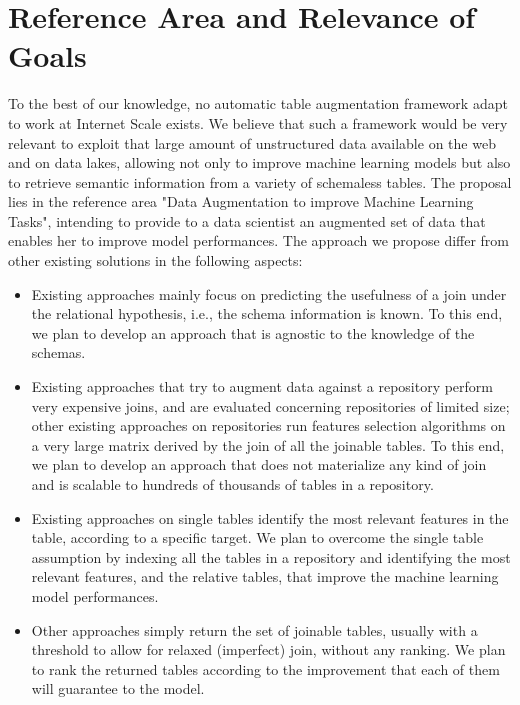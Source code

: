 \section{Reference Area and Relevance of Goals}\label{reference}
To the best of our knowledge, no automatic table augmentation framework adapt to work at Internet Scale exists. We believe that such a framework would be very relevant to exploit that large amount of unstructured data available on the web and on data lakes, allowing not only to improve machine learning models but also to retrieve semantic information from a variety of schemaless tables.
The proposal lies in the reference area "Data Augmentation to improve Machine Learning Tasks", intending to provide to a data scientist an augmented set of data that enables her to improve model performances. The approach we propose differ from other existing solutions in the following aspects:
\begin{itemize}
    \item Existing approaches mainly focus on predicting the usefulness of a join under the relational hypothesis, i.e., the schema information is known. To this end, we plan to develop an approach that is agnostic to the knowledge of the schemas.
    \item Existing approaches that try to augment data against a repository perform very expensive joins, and are evaluated concerning repositories of limited size; other existing approaches on repositories run features selection algorithms on a very large matrix derived by the join of all the joinable tables. To this end, we plan to develop an approach that does not materialize any kind of join and is scalable to hundreds of thousands of tables in a repository.
    \item Existing approaches on single tables identify the most relevant features in the table, according to a specific target. We plan to overcome the single table assumption by indexing all the tables in a repository and identifying the most relevant features, and the relative tables, that improve the machine learning model performances.
    \item Other approaches simply return the set of joinable tables, usually with a threshold to allow for relaxed  (imperfect) join, without any ranking. We plan to rank the returned tables according to the improvement that each of them will guarantee to the model.
\end{itemize}    